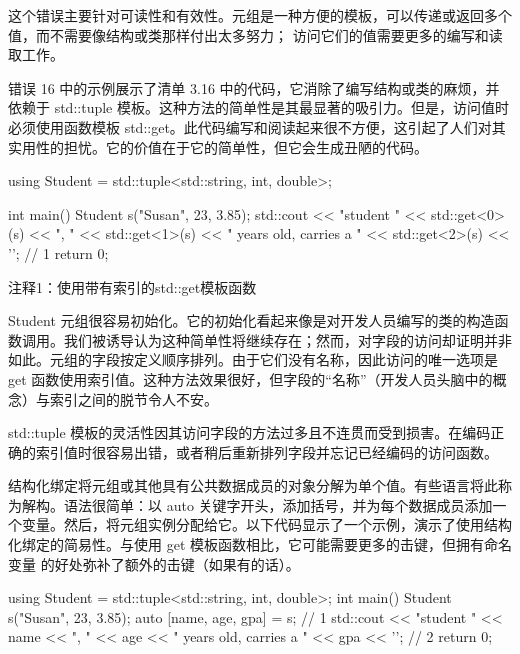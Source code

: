 这个错误主要针对可读性和有效性。元组是一种方便的模板，可以传递或返回多个值，而不需要像结构或类那样付出太多努力； 访问它们的值需要更多的编写和读取工作。


错误 16 中的示例展示了清单 3.16 中的代码，它消除了编写结构或类的麻烦，并依赖于 std::tuple 模板。这种方法的简单性是其最显著的吸引力。但是，访问值时必须使用函数模板 std::get。此代码编写和阅读起来很不方便，这引起了人们对其实用性的担忧。它的价值在于它的简单性，但它会生成丑陋的代码。


\begin{cpp}
using Student = std::tuple<std::string, int, double>;

int main() {
  Student s("Susan", 23, 3.85);
  std::cout << "student " << std::get<0>(s) << ", " << std::get<1>(s) <<
        " years old, carries a " << std::get<2>(s) << '\n'; // 1
  return 0;
}
\end{cpp}

{\footnotesize
注释1：使用带有索引的std::get模板函数
}


Student 元组很容易初始化。它的初始化看起来像是对开发人员编写的类的构造函数调用。我们被诱导认为这种简单性将继续存在；然而，对字段的访问却证明并非如此。元组的字段按定义顺序排列。由于它们没有名称，因此访问的唯一选项是 get 函数使用索引值。这种方法效果很好，但字段的“名称”（开发人员头脑中的概念）与索引之间的脱节令人不安。


std::tuple 模板的灵活性因其访问字段的方法过多且不连贯而受到损害。在编码正确的索引值时很容易出错，或者稍后重新排列字段并忘记已经编码的访问函数。

结构化绑定将元组或其他具有公共数据成员的对象分解为单个值。有些语言将此称为解构。语法很简单：以 auto 关键字开头，添加括号，并为每个数据成员添加一个变量。然后，将元组实例分配给它。以下代码显示了一个示例，演示了使用结构化绑定的简易性。与使用 get 模板函数相比，它可能需要更多的击键，但拥有命名变量 的好处弥补了额外的击键（如果有的话）。


\begin{cpp}
using Student = std::tuple<std::string, int, double>;
int main() {
  Student s("Susan", 23, 3.85);
  auto [name, age, gpa] = s; // 1
  std::cout << "student " << name << ", " << age <<
      " years old, carries a " << gpa << '\n'; // 2
  return 0;
}
\end{cpp}

